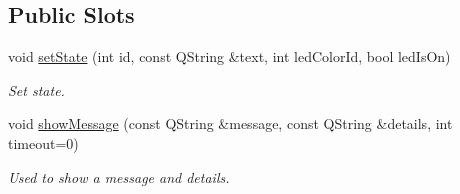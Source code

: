 \subsection*{Public Slots}
\begin{DoxyCompactItemize}
\item 
void \hyperlink{classmdt_port_status_widget_a489b587cd7be7dd6ae6f2782565553bf}{set\-State} (int id, const Q\-String \&text, int led\-Color\-Id, bool led\-Is\-On)
\begin{DoxyCompactList}\small\item\em Set state. \end{DoxyCompactList}\item 
void \hyperlink{classmdt_port_status_widget_a8fce28ddb290512f5681cf800ac17b81}{show\-Message} (const Q\-String \&message, const Q\-String \&details, int timeout=0)
\begin{DoxyCompactList}\small\item\em Used to show a message and details. \end{DoxyCompactList}\end{DoxyCompactItemize}
